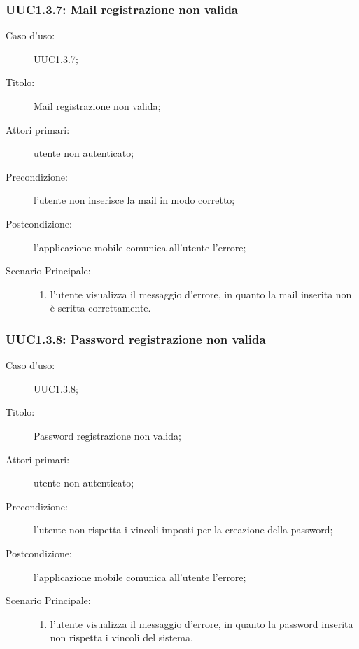\documentclass[../../../analisi-dei-requisiti.tex]{subfiles}
\begin{document}
\subsubsection{UUC1.3.7: Mail registrazione non valida}%
\label{subs:UUC1.3.7}
\begin{description}
  \item[Caso d'uso:] UUC1.3.7;
  \item[Titolo:] Mail registrazione non valida;
  \item[Attori primari:] utente non autenticato;
  \item[Precondizione:] l'utente non inserisce la mail in modo corretto;
  \item[Postcondizione:] l'applicazione mobile comunica all'utente l'errore;
  \item[Scenario Principale:]
        \begin{enumerate}
          \item l'utente visualizza il messaggio d'errore, in quanto la mail inserita non è scritta correttamente.
        \end{enumerate}
\end{description}

\subsubsection{UUC1.3.8: Password registrazione non valida}%
\label{subs:UUC1.3.8}
\begin{description}
  \item[Caso d'uso:] UUC1.3.8;
  \item[Titolo:] Password registrazione non valida;
  \item[Attori primari:] utente non autenticato;
  \item[Precondizione:] l'utente non rispetta i vincoli imposti per la creazione della password;
  \item[Postcondizione:] l'applicazione mobile comunica all'utente l'errore;
  \item[Scenario Principale:]
        \begin{enumerate}
          \item l'utente visualizza il messaggio d'errore, in quanto la password inserita non rispetta i vincoli del sistema.
        \end{enumerate}
\end{description}
\end{document}
